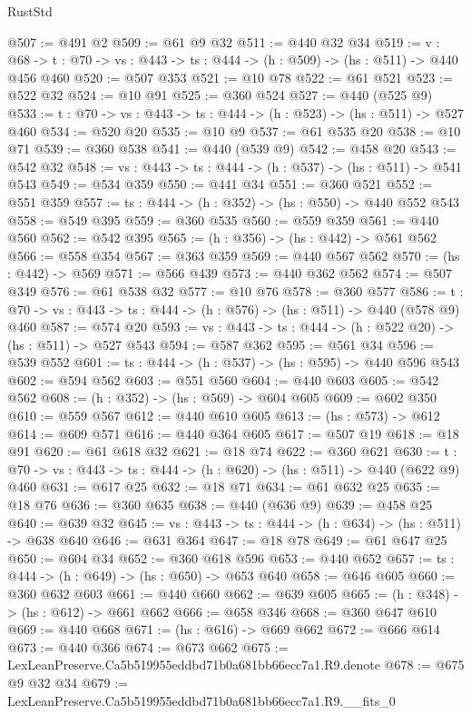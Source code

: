 \begin{lexlean}{RustStd}
\begin{coremodule}
@507 := @491 @2
@509 := @61 @9 @32
@511 := @440 @32 @34
@519 := {v : @68} ->
  {t : @70} -> {vs : @443} -> {ts : @444} -> (h : @509) -> (hs : @511) -> @440 @456 @460
@520 := @507 @353
@521 := @10 @78
@522 := @61 @521
@523 := @522 @32
@524 := @10 @91
@525 := @360 @524
@527 := @440 (@525 @9)
@533 := {t : @70} -> {vs : @443} -> {ts : @444} -> (h : @523) -> (hs : @511) -> @527 @460
@534 := @520 @20
@535 := @10 @9
@537 := @61 @535 @20
@538 := @10 @71
@539 := @360 @538
@541 := @440 (@539 @9)
@542 := @458 @20
@543 := @542 @32
@548 := {vs : @443} -> {ts : @444} -> (h : @537) -> (hs : @511) -> @541 @543
@549 := @534 @359
@550 := @441 @34
@551 := @360 @521
@552 := @551 @359
@557 := {ts : @444} -> (h : @352) -> (hs : @550) -> @440 @552 @543
@558 := @549 @395
@559 := @360 @535
@560 := @559 @359
@561 := @440 @560
@562 := @542 @395
@565 := (h : @356) -> (hs : @442) -> @561 @562
@566 := @558 @354
@567 := @363 @359
@569 := @440 @567 @562
@570 := (hs : @442) -> @569
@571 := @566 @439
@573 := @440 @362 @562
@574 := @507 @349
@576 := @61 @538 @32
@577 := @10 @76
@578 := @360 @577
@586 := {t : @70} -> {vs : @443} -> {ts : @444} -> (h : @576) -> (hs : @511) -> @440 (@578 @9) @460
@587 := @574 @20
@593 := {vs : @443} -> {ts : @444} -> (h : @522 @20) -> (hs : @511) -> @527 @543
@594 := @587 @362
@595 := @561 @34
@596 := @539 @552
@601 := {ts : @444} -> (h : @537) -> (hs : @595) -> @440 @596 @543
@602 := @594 @562
@603 := @551 @560
@604 := @440 @603
@605 := @542 @562
@608 := (h : @352) -> (hs : @569) -> @604 @605
@609 := @602 @350
@610 := @559 @567
@612 := @440 @610 @605
@613 := (hs : @573) -> @612
@614 := @609 @571
@616 := @440 @364 @605
@617 := @507 @19
@618 := @18 @91
@620 := @61 @618 @32
@621 := @18 @74
@622 := @360 @621
@630 := {t : @70} -> {vs : @443} -> {ts : @444} -> (h : @620) -> (hs : @511) -> @440 (@622 @9) @460
@631 := @617 @25
@632 := @18 @71
@634 := @61 @632 @25
@635 := @18 @76
@636 := @360 @635
@638 := @440 (@636 @9)
@639 := @458 @25
@640 := @639 @32
@645 := {vs : @443} -> {ts : @444} -> (h : @634) -> (hs : @511) -> @638 @640
@646 := @631 @364
@647 := @18 @78
@649 := @61 @647 @25
@650 := @604 @34
@652 := @360 @618 @596
@653 := @440 @652
@657 := {ts : @444} -> (h : @649) -> (hs : @650) -> @653 @640
@658 := @646 @605
@660 := @360 @632 @603
@661 := @440 @660
@662 := @639 @605
@665 := (h : @348) -> (hs : @612) -> @661 @662
@666 := @658 @346
@668 := @360 @647 @610
@669 := @440 @668
@671 := (hs : @616) -> @669 @662
@672 := @666 @614
@673 := @440 @366
@674 := @673 @662
@675 := LexLeanPreserve.Ca5b519955eddbd71b0a681bb66ecc7a1.R9.denote
@678 := @675 @9 @32 @34
@679 := LexLeanPreserve.Ca5b519955eddbd71b0a681bb66ecc7a1.R9.__fits_0

\end{coremodule}
\end{lexlean}

